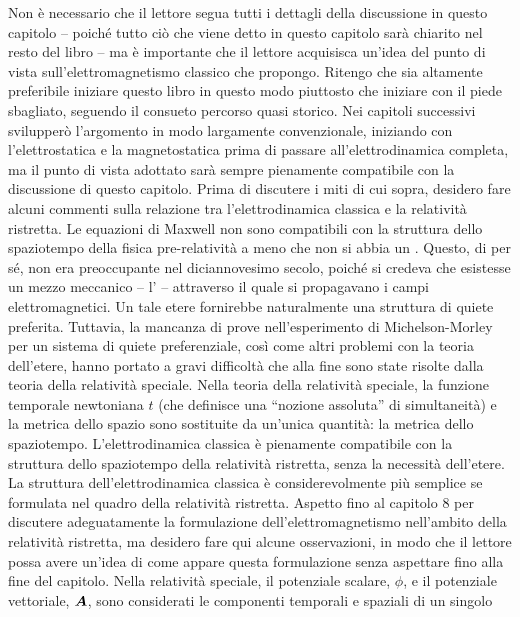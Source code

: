 Non è necessario che il lettore segua tutti i dettagli della discussione in questo capitolo -- poiché tutto ciò che viene detto in questo capitolo sarà chiarito nel resto del libro -- ma è importante che il lettore acquisisca un’idea del punto di vista sull’elettromagnetismo classico che propongo. Ritengo che sia altamente preferibile iniziare questo libro in questo modo piuttosto che iniziare con il piede sbagliato, seguendo il consueto percorso quasi storico. Nei capitoli successivi svilupperò l'argomento in modo largamente convenzionale, iniziando con l'elettrostatica e la magnetostatica prima di passare all'elettrodinamica completa, ma il punto di vista adottato sarà sempre pienamente compatibile con la discussione di questo capitolo. Prima di discutere i miti di cui sopra, desidero fare alcuni commenti sulla relazione tra l’elettrodinamica classica e la relatività ristretta. Le equazioni di Maxwell non sono compatibili con la struttura dello spaziotempo della fisica pre-relatività a meno che non si abbia un . Questo, di per sé, non era preoccupante nel diciannovesimo secolo, poiché si credeva che esistesse un mezzo meccanico – l’ – attraverso il quale si propagavano i campi elettromagnetici. Un tale etere fornirebbe naturalmente una struttura di quiete preferita. Tuttavia, la mancanza di prove nell'esperimento di Michelson-Morley per un sistema di quiete preferenziale, così come altri problemi con la teoria dell'etere, hanno portato a gravi difficoltà che alla fine sono state risolte dalla teoria della relatività speciale. Nella teoria della relatività speciale, la funzione temporale newtoniana $t$ (che definisce una “nozione assoluta” di simultaneità) e la metrica dello spazio sono sostituite da un’unica quantità: la metrica dello spaziotempo. L’elettrodinamica classica è pienamente compatibile con la struttura dello spaziotempo della relatività ristretta, senza la necessità dell’etere. La struttura dell'elettrodinamica classica è considerevolmente più semplice se formulata nel quadro della relatività ristretta. Aspetto fino al capitolo 8 per discutere adeguatamente la formulazione dell'elettromagnetismo nell'ambito della relatività ristretta, ma desidero fare qui alcune osservazioni, in modo che il lettore possa avere un'idea di come appare questa formulazione senza aspettare fino alla fine del capitolo. Nella relatività speciale, il potenziale scalare, $\phi$, e il potenziale vettoriale, $\vb*{A}$, sono considerati le componenti temporali e spaziali di un singolo 
